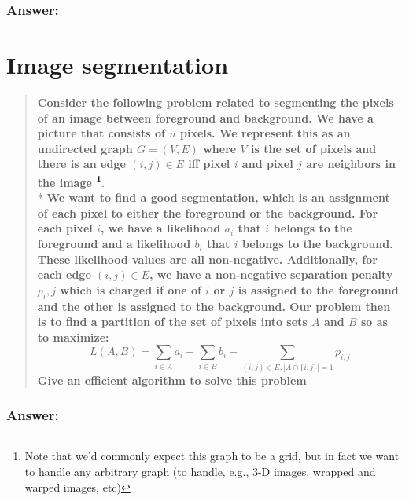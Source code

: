 \documentclass[titlepage]{article}\usepackage[]{graphicx}\usepackage[]{color}
\begin{document}
  \subsubsection{Answer:}
  \vspace{9cm}



\section{Image segmentation}
  \begin{quote}
    \textbf{Consider the following problem related to segmenting the pixels
      of an image between foreground and background. We have a picture that
      consists of $n$ pixels. We represent this as an undirected graph $G =
      (V,E)$ where $V$ is the set of pixels and there is an edge $(i,j) \in
      E$ iff pixel $i$ and pixel $j$ are neighbors in the image
      \footnote{Note that we'd commonly expect this graph to be a grid, but
        in fact we want to handle any arbitrary graph (to handle, e.g., 3-D
        images, wrapped and warped images, etc)}}. \\* 
        \textbf{We want to find
        a good segmentation, which is an assignment of each pixel to either
        the foreground or the background.  For each pixel $i$, we have a
        likelihood $a_i$ that $i$ belongs to the foreground and a likelihood
        $b_i$ that $i$ belongs to the background. These likelihood values are
        all non-negative. Additionally, for each edge $(i, j) \in E$, we have
        a non-negative separation penalty $p_i,j$ which is charged if one of
        $i$ or $j$ is assigned to the foreground and the other is assigned to
        the background.  Our problem then is to find a partition of the set
        of pixels into sets $A$ and $B$ so as to maximize:}
    \[ L(A, B) = \sum_{i \in A}  a_i + \sum_{i \in B} b_i − \sum_{(i,j) \in E, | A \cap \{i,j\} | = 1} p_{i,j} \]
      \textbf{Give an efficient algorithm to solve this problem}
  \end{quote}

  \subsubsection{Answer:}

  \vspace{9cm}
\end{document}
